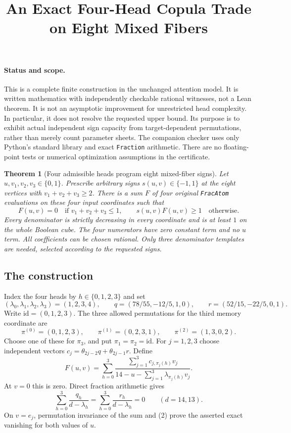 \documentclass[11pt]{article}
\title{An Exact Four-Head Copula Trade on Eight Mixed Fibers}
\author{}
\date{}
\newtheorem{theorem}{Theorem}
\begin{document}
\maketitle

\paragraph{Status and scope.}
This is a complete finite construction in the unchanged attention model.
It is written mathematics with independently checkable rational witnesses,
not a Lean theorem. It is not an asymptotic improvement for unrestricted
head complexity. In particular, it does not resolve the requested upper
bound. Its purpose is to exhibit actual independent sign capacity from
target-dependent permutations, rather than merely count parameter sheets.
The companion checker uses only Python's standard library and exact
\texttt{Fraction} arithmetic. There are no floating-point tests or numerical
optimization assumptions in the certificate.

\begin{theorem}[Four admissible heads program eight mixed-fiber signs]
Let $u,v_1,v_2,v_3\in\{0,1\}$. Prescribe arbitrary signs
$s(u,v)\in\{-1,1\}$ at the eight vertices with
$v_1+v_2+v_3\ge2$. There is a sum $F$ of four original
\texttt{FracAtom} evaluations on these four input coordinates such that
\[
 F(u,v)=0\quad\text{if }v_1+v_2+v_3\le1,
 \qquad s(u,v)F(u,v)\ge1\quad\text{otherwise}.
\]
Every denominator is strictly decreasing in every coordinate and is at
least $1$ on the whole Boolean cube. The four numerators have zero constant
term and no $u$ term. All coefficients can be chosen rational. Only three
denominator templates are needed, selected according to the requested
signs.
\end{theorem}

\subsection*{The construction}
Index the four heads by $h\in\{0,1,2,3\}$ and set
\[
 (\lambda_0,\lambda_1,\lambda_2,\lambda_3)=(1,2,3,4),\qquad
 q=(78/55,-12/5,1,0),\qquad
 r=(52/15,-22/5,0,1).
\]
Write $\mathrm{id}=(0,1,2,3)$. The three allowed permutations for
the third memory coordinate are
\[
 \pi^{(0)}=(0,1,2,3),\qquad
 \pi^{(1)}=(0,2,3,1),\qquad
 \pi^{(2)}=(1,3,0,2).
\]
Choose one of these for $\pi_3$, and put
$\pi_1=\pi_2=\mathrm{id}$. For $j=1,2,3$ choose independent
vectors $c_j=\theta_{2j-2}q+\theta_{2j-1}r$. Define
\[
 F(u,v)=\sum_{h=0}^3
 \frac{\sum_{j=1}^3 c_{j,\pi_j(h)}v_j}
 {14-u-\sum_{j=1}^3\lambda_{\pi_j(h)}v_j}.
 \tag{1}
\]
At $v=0$ this is zero. Direct fraction arithmetic gives
\[
 \sum_{h=0}^3\frac{q_h}{d-\lambda_h}
 =\sum_{h=0}^3\frac{r_h}{d-\lambda_h}=0
 \qquad(d=14,13).
 \tag{2}
\]
On $v=e_j$, permutation invariance of the sum and (2) prove the
asserted exact vanishing for both values of $u$.
\end{document}
